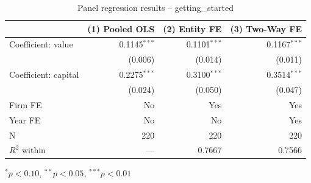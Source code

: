 \begin{table}[htbp]
\centering
\caption{Panel regression results -- getting\_started}
\begin{threeparttable}
\begin{tabular}{lrrr}
\toprule
 & (1) Pooled OLS & (2) Entity FE & (3) Two-Way FE \\
\midrule
Coefficient: value & 0.1145$^{***}$ & 0.1101$^{***}$ & 0.1167$^{***}$ \\
 & (0.006) & (0.014) & (0.011) \\
Coefficient: capital & 0.2275$^{***}$ & 0.3100$^{***}$ & 0.3514$^{***}$ \\
 & (0.024) & (0.050) & (0.047) \\
\midrule
Firm FE & No & Yes & Yes \\
Year FE & No & No & Yes \\
\midrule
N & 220 & 220 & 220 \\
$R^2$ within & --- & 0.7667 & 0.7566 \\
\bottomrule
\end{tabular}
\begin{tablenotes}[flushleft]
  \footnotesize
  \item $^{*}p<0.10$, $^{**}p<0.05$, $^{***}p<0.01$
\end{tablenotes}
\end{threeparttable}
\end{table}
